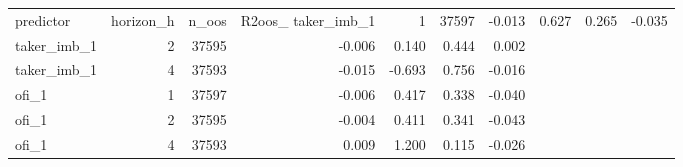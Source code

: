 \begin{tabular}{lrrrrrr}
\toprule
predictor & horizon_h & n_oos & R2oos_%
\midrule
taker_imb_1 & 1 & 37597 & -0.013 & 0.627 & 0.265 & -0.035 \\
taker_imb_1 & 2 & 37595 & -0.006 & 0.140 & 0.444 & 0.002 \\
taker_imb_1 & 4 & 37593 & -0.015 & -0.693 & 0.756 & -0.016 \\
ofi_1 & 1 & 37597 & -0.006 & 0.417 & 0.338 & -0.040 \\
ofi_1 & 2 & 37595 & -0.004 & 0.411 & 0.341 & -0.043 \\
ofi_1 & 4 & 37593 & 0.009 & 1.200 & 0.115 & -0.026 \\
\bottomrule
\end{tabular}
